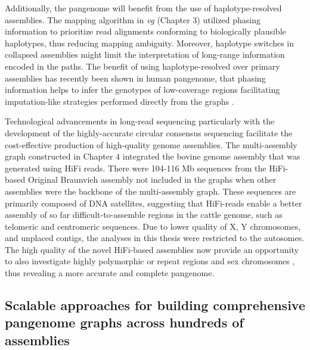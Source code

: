 \documentclass[../main.tex]{subfiles}
\begin{document}
Additionally, the pangenome will benefit from the use of haplotype-resolved assemblies. The mapping algorithm in \emph{vg} (Chapter 3) utilized phasing information to prioritize read alignments conforming to biologically plausible  haplotypes, thus reducing mapping ambiguity. Moreover, haplotype switches in collapsed assemblies might limit the interpretation of long-range information encoded in the paths. The benefit of using haplotype-resolved over primary assemblies has recently been shown in human pangenome, that phasing information helps to infer the genotypes of low-coverage regions facilitating imputation-like strategies performed directly from the graphs \citep{ebler2020pangenome,ebert2021haplotype}. 

Technological advancements in long-read sequencing particularly with the development of the highly-accurate circular consensus sequencing \citep{Wenger2019} facilitate the cost-effective production of high-quality genome assemblies. The multi-assembly graph constructed in Chapter 4 integrated the bovine genome assembly that was generated using HiFi reads. There were 104-116 Mb sequences from the HiFi-based Original Braunvieh assembly not included in the graphs when other assemblies were the backbone of the multi-assembly graph. These sequences are primarily composed of DNA satellites, suggesting that HiFi-reads enable a better assembly of so far difficult-to-assemble regions in the cattle genome, such as telomeric and centromeric sequences. Due to lower quality of X, Y chromosomes, and unplaced contigs, the analyses in this thesis were restricted to the autosomes. The high quality of the novel HiFi-based assemblies now provide an opportunity to also investigate highly polymorphic or repeat regions and sex chromosomes \citep{logsdon2021structure,miga2020telomere}, thus revealing a more accurate and complete pangenome.  

\subsection*{Scalable approaches for building comprehensive pangenome graphs across hundreds of assemblies}
\end{document}
